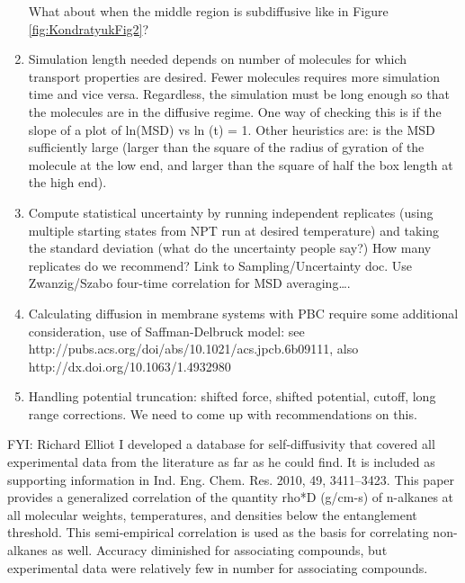 \documentclass[9pt]{livecoms}
\begin{document}
\begin{enumerate}
	What about when the middle region is subdiffusive like in Figure \ref{fig:KondratyukFig2}?
	\item Simulation length needed depends on number of molecules for which transport properties are desired. Fewer molecules requires more simulation time and vice versa. Regardless, the simulation must be long enough so that the molecules are in the diffusive regime. One way of checking this is if the slope of a plot of ln(MSD) vs ln (t) = 1. Other heuristics are: is the MSD sufficiently large (larger than the square of the radius of gyration of the molecule at the low end, and larger than the square of half the box length at the high end).
	\item Compute statistical uncertainty by running independent replicates (using multiple starting states from NPT run at desired temperature) and taking the standard deviation (what do the uncertainty people say?) How many replicates do we recommend? Link to Sampling/Uncertainty doc. Use Zwanzig/Szabo four-time correlation for MSD averaging…. \label{item:uncertainty}
	\item Calculating diffusion in membrane systems with PBC require some additional consideration, use of Saffman-Delbruck model: see http://pubs.acs.org/doi/abs/10.1021/acs.jpcb.6b09111, also http://dx.doi.org/10.1063/1.4932980
	\item Handling potential truncation: shifted force, shifted potential, cutoff, long range corrections. We need to come up with recommendations on this.
\end{enumerate}

FYI: Richard Elliot I developed a database for self-diffusivity that covered all experimental data from the literature as far as he could find. It is included as supporting information in Ind. Eng. Chem. Res. 2010, 49, 3411–3423. This paper provides a generalized correlation of the quantity rho*D (g/cm-s) of n-alkanes at all molecular weights, temperatures, and densities below the entanglement threshold. This semi-empirical correlation is used as the basis for correlating non-alkanes as well. Accuracy diminished for associating compounds, but experimental data were relatively few in number for associating compounds.
\end{document}
